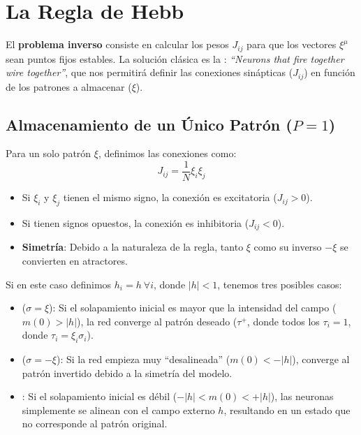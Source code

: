 \section{La Regla de Hebb}

El \textbf{problema inverso} consiste en calcular los pesos $J_{ij}$ para que los vectores $\xi^{\mu}$ sean puntos fijos estables. La solución clásica es la : \textit{``Neurons that fire together wire together''}, que nos permitirá definir las conexiones sinápticas ($J_{ij}$) en función de los patrones a almacenar ($\xi$).

\subsection{Almacenamiento de un Único Patrón ($P=1$)}
\noindent
Para un solo patrón $\xi$, definimos las conexiones como:
\begin{equation}
    J_{ij} = \frac{1}{N} \xi_{i} \xi_{j}
\end{equation}
\begin{itemize}
    \item Si $\xi_i$ y $\xi_j$ tienen el mismo signo, la conexión es excitatoria ($J_{ij} > 0$).
    \item Si tienen signos opuestos, la conexión es inhibitoria ($J_{ij} < 0$).
    \item \textbf{Simetría}: Debido a la naturaleza de la regla, tanto $\xi$ como su inverso $-\xi$ se convierten en atractores.
\end{itemize}
Si en este caso definimos $h_i=h \ \forall i$, donde $|h|<1$, tenemos tres posibles casos:
\begin{itemize}
    \item {} ($\sigma = \xi$): Si el solapamiento inicial es mayor que la intensidad del campo ($m(0) > |h|$), la red converge al patrón deseado ($\tau^+$, donde todos los $\tau_i = 1$, donde $\tau_i = \xi_i \sigma_i$).
    \item {} ($\sigma = -\xi$): Si la red empieza muy ``desalineada'' ($m(0) < -|h|$), converge al patrón invertido debido a la simetría del modelo.
    \item {}: Si el solapamiento inicial es débil ($-|h| < m(0) < +|h|$), las neuronas simplemente se alinean con el campo externo $h$, resultando en un estado que no corresponde al patrón original.
\end{itemize}

